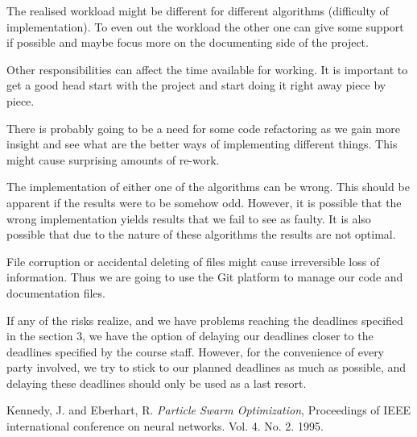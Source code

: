 \documentclass[twoside]{article}
\begin{document}
\begin{multicols}{2}
The realised workload might be different for different algorithms (difficulty of implementation). To even out the workload the other one can give some support if possible and maybe focus more on the documenting side of the project.

Other responsibilities can affect the time available for working. It is important to get a good head start with the project and start doing it right away piece by piece.

There is probably going to be a need for some code refactoring as we gain more insight and see what are the better ways of implementing different things. This might cause surprising amounts of re-work.

The implementation of either one of the algorithms can be wrong. This should be apparent if the results were to be somehow odd. However, it is possible that the wrong implementation yields results that we fail to see as faulty. It is also possible that due to the nature of these algorithms the results are not optimal.

File corruption or accidental deleting of files might cause irreversible loss of information. Thus we are going to use the Git platform to manage our code and documentation files.

If any of the risks realize, and we have problems reaching the deadlines specified in the section 3, we have the option of delaying our deadlines closer to the deadlines specified by the course staff. However, for the convenience of every party involved, we try to stick to our planned deadlines as much as possible, and delaying these deadlines should only be used as a last resort.

\begin{thebibliography}{99} %

 Kennedy, J. and Eberhart, R.
  \emph{Particle Swarm Optimization},
 Proceedings of IEEE international conference on neural networks. Vol. 4. No. 2. 1995. 
 

 
 
\end{thebibliography}


\end{multicols}
\end{document}
